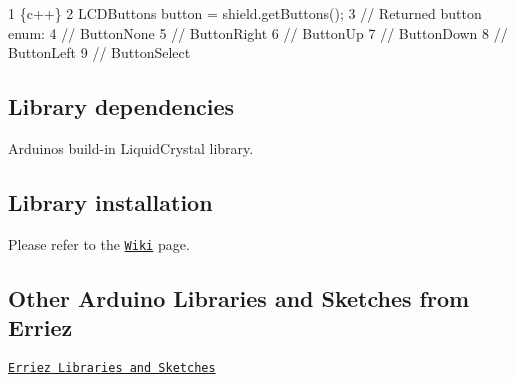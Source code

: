 \begin{DoxyCode}
1 \{c++\}
2 LCDButtons button = shield.getButtons();
3 // Returned button enum:
4 //   ButtonNone
5 //   ButtonRight
6 //   ButtonUp
7 //   ButtonDown
8 //   ButtonLeft
9 //   ButtonSelect
\end{DoxyCode}


\subsection*{Library dependencies}


\begin{DoxyItemize}
\item Arduino\textquotesingle{}s build-\/in {\ttfamily Liquid\+Crystal} library.
\end{DoxyItemize}

\subsection*{Library installation}

Please refer to the \href{https://github.com/Erriez/ErriezArduinoLibrariesAndSketches/wiki}{\tt Wiki} page.

\subsection*{Other Arduino Libraries and Sketches from Erriez}


\begin{DoxyItemize}
\item \href{https://github.com/Erriez/ErriezArduinoLibrariesAndSketches}{\tt Erriez Libraries and Sketches} 
\end{DoxyItemize}